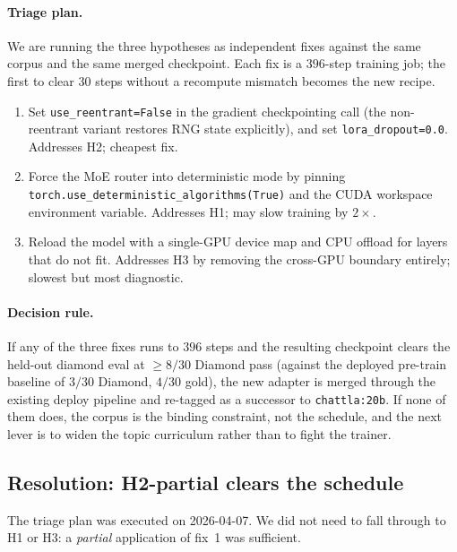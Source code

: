 \documentclass[11pt]{article}
\begin{document}
\paragraph{Triage plan.} We are running the three hypotheses as
independent fixes against the same corpus and the same merged
checkpoint. Each fix is a $396$-step training job; the first to clear
$30$ steps without a recompute mismatch becomes the new recipe.
\begin{enumerate}[leftmargin=1.4em, itemsep=2pt]
\item Set \texttt{use\_reentrant=False} in the gradient checkpointing
  call (the non-reentrant variant restores RNG state explicitly), and
  set \texttt{lora\_dropout=0.0}. Addresses H2; cheapest fix.
\item Force the MoE router into deterministic mode by pinning
  \texttt{torch.use\_deterministic\_algorithms(True)} and the CUDA
  workspace environment variable. Addresses H1; may slow training by
  $2\!\times$.
\item Reload the model with a single-GPU device map and CPU offload
  for layers that do not fit. Addresses H3 by removing the cross-GPU
  boundary entirely; slowest but most diagnostic.
\end{enumerate}

\paragraph{Decision rule.} If any of the three fixes runs to $396$
steps and the resulting checkpoint clears the held-out diamond eval
at $\ge\!8/30$ Diamond pass (against the deployed pre-train baseline
of $3/30$ Diamond, $4/30$ gold), the new adapter is merged through
the existing deploy pipeline and re-tagged as a successor to
\texttt{chattla:20b}. If none of them does, the corpus is the binding
constraint, not the schedule, and the next lever is to widen the
topic curriculum rather than to fight the trainer.

\subsection{Resolution: H2-partial clears the schedule}
\label{sec:sftv3-resolution}

The triage plan was executed on 2026-04-07. We did not need to fall
through to H1 or H3: a \emph{partial} application of fix~1 was
sufficient.
\end{document}
